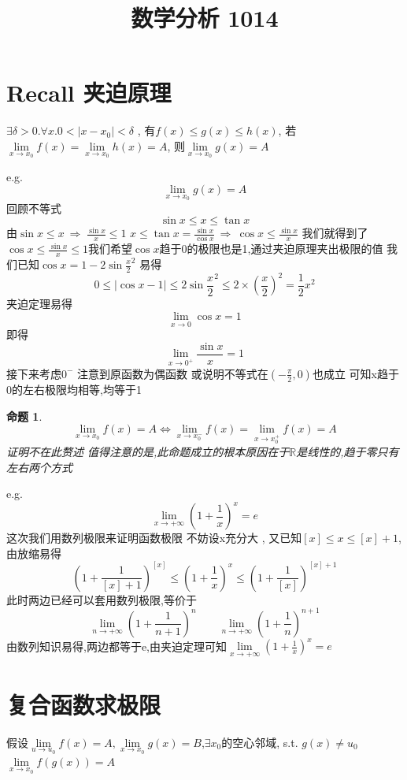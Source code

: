 \documentclass[UTF8,11pt]{ctexart}
\title{数学分析 1014}
\date{}
\theoremstyle{cnthm}
\newtheorem{prop}[thm]{命题}
\begin{document}
\maketitle

\section{Recall 夹迫原理}

$\exists \delta > 0 . \forall x . 0<|x-x_0|< \delta$ , 有$f(x) \leq g(x) \leq h(x)$, 若$\lim\limits_{x \to x_0}f(x) = \lim\limits_{x \to x_0}h(x) = A$, 则$\lim\limits_{x \to x_0}g(x) = A$

e.g. 
\[
\lim\limits_{x \to x_0}g(x) = A
\]
回顾不等式
\[
\sin{x} \leq x \leq \tan{x}
\]
由$\sin{x} \leq x \ \Rightarrow \ \frac{\sin{x}}{x} \leq 1$
$x \leq \tan{x} = \frac{\sin{x}}{\cos{x}} \ \Rightarrow \ \cos{x} \leq \frac{\sin{x}}{x}$
我们就得到了$\cos{x} \leq \frac{\sin{x}}{x} \leq 1$我们希望$\cos{x}$趋于0的极限也是1,通过夹迫原理夹出极限的值
我们已知$\cos{x} = 1 - 2\sin{\frac{x}{2}}^2$
易得
\[
0 \leq |\cos{x}-1| \leq 2\sin{\frac{x}{2}}^2 \leq 2 \times (\frac{x}{2})^2 = \frac{1}{2}x^2
\]
夹迫定理易得
\[
\lim_{x \to 0} \cos{x} = 1
\]
即得
\[
\lim_{x \to 0^+} \frac{\sin{x}}{x} = 1
\]
接下来考虑$0^-$
注意到原函数为偶函数
或说明不等式在$(-\frac{\pi}{2} , 0)$也成立
可知x趋于0的左右极限均相等,均等于1

\begin{prop}
\[
\lim_{x \to x_0}f(x) = A \Leftrightarrow \lim_{x \to x_0^-}f(x) = \lim_{x \to x_0^+}f(x) = A
\]
证明不在此赘述
值得注意的是,此命题成立的根本原因在于$\mathbb{R}$是线性的,趋于零只有左右两个方式
\end{prop}

e.g.
\[
\lim_{x \to +\infty}(1+\frac{1}{x})^x = e
\]
这次我们用数列极限来证明函数极限
不妨设x充分大 , 又已知$[x] \leq x \leq [x]+1$,由放缩易得
\[
(1+\frac{1}{[x]+1})^{[x]} \leq (1+\frac{1}{x})^x \leq (1+\frac{1}{[x]})^{[x]+1}
\]
此时两边已经可以套用数列极限,等价于
\[
\lim_{n \to +\infty}(1+\frac{1}{n+1})^n \qquad \lim_{n \to +\infty}(1+\frac{1}{n})^{n+1}
\]
由数列知识易得,两边都等于e,由夹迫定理可知$\lim\limits_{x \to +\infty}(1+\frac{1}{x})^x = e$

\section{复合函数求极限}

假设$\lim\limits_{u \to u_0}f(x) = A , \lim\limits_{x \to x_0}g(x) = B$,$\exists x_0$的空心邻域, s.t. $g(x) \neq u_0$$\lim\limits_{x \to x_0}f(g(x)) = A$
\end{document}
